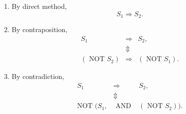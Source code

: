 \documentclass[12pt,thmsa]{article}
\begin{document}
\begin{enumerate}
	\item By direct method, \[ S_{1} \Longrightarrow S_{2}.  \]
	\item By contraposition, \[ \begin{array}{rcl} S_{1} & \Longrightarrow & S_{2}, \\ & \Updownarrow &\\ \left( \text{ NOT } S_{2}\right) & \Longrightarrow & \left(\text { NOT } S_{1}\right). \end{array}\]
	\item By contradiction, \[ \begin{array}{rcl} S_{1} & \Longrightarrow & S_{2}, \\ & \Updownarrow & \\ \text{NOT } \Big(S_1, &\text{ AND }& (\text{ NOT } S_2 ) \Big). \end{array} \]

\end{enumerate}



\end{document}
